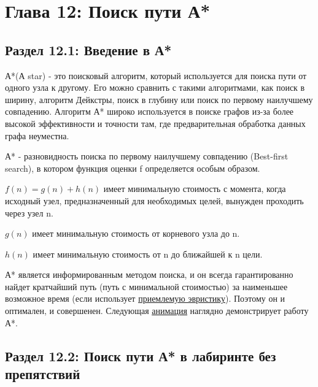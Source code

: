 \chapter*{Глава 12: Поиск пути А*}
\section*{Раздел 12.1: Введение в А*}

А*(А star) - это поисковый алгоритм, который используется для поиска пути от одного узла к другому. Его можно сравнить с такими алгоритмами, как поиск в ширину, алгоритм Дейкстры, поиск в глубину или поиск по первому наилучшему совпадению. Алгоритм А* широко используется в поиске графов из-за более высокой эффективности и точности там, где предварительная обработка данных графа неуместна.

\vspace{\baselineskip}

А* - разновидность поиска по первому наилучшему совпадению (Best-first
search), в котором функция оценки f определяется особым образом.

\vspace{\baselineskip}

$f(n)=g(n)+h(n)$ имеет минимальную стоимость с момента, когда исходный узел, предназначенный для необходимых целей, вынужден проходить через узел n.

\vspace{\baselineskip}

$g(n)$ имеет минимальную стоимость от корневого узла до n.

\vspace{\baselineskip}

$h(n)$ имеет минимальную стоимость от n до ближайшей к n цели.

\vspace{\baselineskip}

А* является информированным методом поиска, и он всегда гарантированно найдет кратчайший путь (путь с минимальной стоимостью) за наименьшее возможное время (если использует \href{https://vk.cc/atzPw1}{\underline{приемлемую эвристику}}). Поэтому он и оптимален, и совершенен. Следующая \href{https://i.stack.imgur.com/TGfc9.gif}{\underline{анимация}} наглядно демонстрирует работу А*.

\vspace{\baselineskip}

\section*{Раздел 12.2: Поиск пути А* в лабиринте без препятствий}

